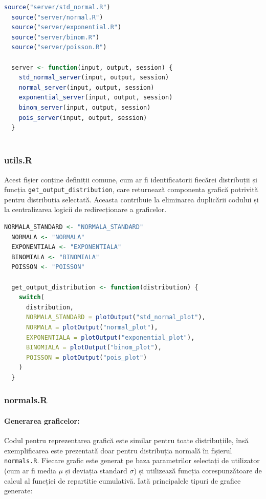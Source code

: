 \documentclass[a4paper,11pt]{article}
\begin{document}
\begin{lstlisting}[language=R]
  source("server/std_normal.R")
  source("server/normal.R")
  source("server/exponential.R")
  source("server/binom.R")
  source("server/poisson.R")
  
  server <- function(input, output, session) {
    std_normal_server(input, output, session)
    normal_server(input, output, session)
    exponential_server(input, output, session)
    binom_server(input, output, session)
    pois_server(input, output, session)
  }
  
\end{lstlisting}

\subsubsection*{utils.R}

Acest fișier conține definiții comune, cum ar fi identificatorii fiecărei distribuții și funcția \texttt{get\_output\_distribution}, care returnează componenta grafică potrivită pentru distribuția selectată. Aceasta contribuie la eliminarea duplicării codului și la centralizarea logicii de redirecționare a graficelor.

\begin{lstlisting}[language=R]
  NORMALA_STANDARD <- "NORMALA_STANDARD"
  NORMALA <- "NORMALA"
  EXPONENTIALA <- "EXPONENTIALA"
  BINOMIALA <- "BINOMIALA"
  POISSON <- "POISSON"
  
  get_output_distribution <- function(distribution) {
    switch(
      distribution,
      NORMALA_STANDARD = plotOutput("std_normal_plot"),
      NORMALA = plotOutput("normal_plot"),
      EXPONENTIALA = plotOutput("exponential_plot"),
      BINOMIALA = plotOutput("binom_plot"),
      POISSON = plotOutput("pois_plot")
    )
  }
\end{lstlisting}

\subsubsection*{normals.R}

\paragraph{Generarea graficelor:}  
Codul pentru reprezentarea grafică este similar pentru toate distribuțiile, însă exemplificarea este prezentată doar pentru distribuția normală în fișierul \texttt{normals.R}.  
Fiecare grafic este generat pe baza parametrilor selectați de utilizator (cum ar fi media \(\mu\) și deviația standard \(\sigma\)) și utilizează funcția corespunzătoare de calcul al funcției de repartitie cumulativă. Iată principalele tipuri de grafice generate:
\end{document}
